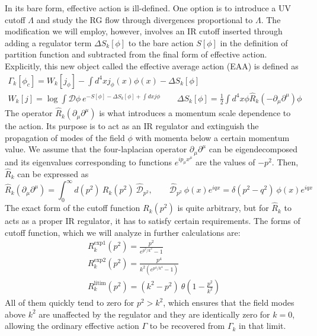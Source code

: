 \documentclass[11pt, a4paper]{article}
\begin{document}
In its bare form, effective action is ill-defined. One option is to introduce a UV cutoff $\Lambda$
and study the RG flow through divergences proportional to $\Lambda$. The modification we will employ, however, involves
an IR cutoff inserted through adding a regulator term $\Delta S_k[\phi]$ to the bare action $S[\phi]$ in the definition of partition function
and subtracted from the final form of effective action. Explicitly, this new object called the effective average action (EAA) is defined as
\begin{gather}
    \Gamma_k[\phi_c] = W_k[j_\phi] - \int d^4 x j_\phi(x) \phi(x) - \Delta S_k[\phi]\\
    W_k[j] = \log{\int \mathcal{D}\phi \ e^{-S[\phi] - \Delta S_k[\phi] + \int dx j \phi}} \qquad \Delta S_k[\phi] = \frac{1}{2}\int d^4 x \phi \hat{R}_k (-\partial_{\mu}\partial^{\mu}) \phi
\end{gather}
The operator $\hat{R}_k (\partial_{\mu}\partial^{\mu})$ is what introduces a momentum scale dependence to the action.
Its purpose is to act as an IR regulator and extinguish the propagation of modes of the field $\phi$ with momenta below a certain momentum value.
We assume that the four-laplacian operator $\partial_{\mu}\partial^{\mu}$ can be eigendecomposed and its eigenvalues corresponding to functions $e^{ip_\mu x^\mu}$ are the values of $-p^2$.
Then, $\hat{R}_k$ can be expressed as
\begin{equation}
    \hat{R}_k (\partial_{\mu}\partial^{\mu}) = \int_0^{\infty} d(p^2) \ R_k(p^2) \ \hat{\mathcal{D}}_{p^2}, \qquad \hat{\mathcal{D}}_{p^2} \ \phi(x) e^{i q x} = \delta(p^2-q^2) \ \phi(x) e^{i q x}
\end{equation}
The exact form of the cutoff function $R_k(p^2)$ is quite arbitrary, but for $\hat{R}_k$ to acts as a proper IR regulator, it has to satisfy certain requirements.
The forms of cutoff function, which we will analyze in further calculations are:
\begin{gather}
    R_k^{\text{exp1}}(p^2) = \frac{p^2}{e^{p^2/k^2} - 1}\\
    R_k^{\text{exp2}}(p^2) = \frac{p^4}{k^2(e^{p^4/k^4} - 1)}\\
    R_k^{\text{litim}}(p^2) = (k^2-p^2) \ \theta \left(1-\frac{p^2}{k^2}\right)
\end{gather}
All of them quickly tend to zero for $p^2 > k^2$, which ensures that the field modes above $k^2$ are unaffected by the regulator
and they are identically zero for $k = 0$, allowing the ordinary effective action $\Gamma$ to be recovered from $\Gamma_k$ in that limit.
\end{document}

